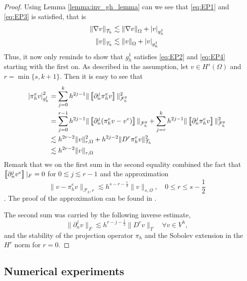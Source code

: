 \begin{proof}
    Using Lemma \ref{lemma:inv_gh_lemma} can we see that \eqref{eq:EP1} and \eqref{eq:EP3} is satisfied, that is \[
    \begin{split}
        \| \nabla v \|_{ \mathcal{T} _{h} }^{  } & \lesssim \| \nabla v \|_{ \Omega  }^{  }  + \left\lvert  v  \right\rvert _{g_{h}^{1}} \\
        \|  v \|_{ \mathcal{T} _{h} }^{  } & \lesssim \|  v \|_{ \Omega  }^{  }  + \left\lvert  v  \right\rvert _{g_{h}^{1}}
    \end{split}
    \]
    Thus, it now only reminds to show that $g_{h}^{1}$  satisfies \eqref{eq:EP2} and \eqref{eq:EP4} starting with the first on. As described in the assumption, let $v \in H^{s}( \Omega ) $ and $r = \min \{s, k+1\} $. Then it is easy to see that \[
        \begin{split}
        \abs{ \pi ^{e}_{h} v }_{g_{h}^{l}}^{2} & = \sum_{j=0}^{k} h^{2j-1} \| \jump{ \partial ^{j}_{n}\pi ^{e}_{h} v  }  \|_{\mathcal{F} _{h}^{g}  }^{2  } \\
        &= \sum_{j=0}^{r-1} h^{2j -1} \| \jump{ \partial ^{j}_{n} ( \pi _{h}^{e} v - v^{e}) }    \|_{\mathcal{F} _{h}^{g}  }^{  } +  \sum_{j=r}^{k} h^{2j-1} \| \jump{ \partial ^{j}_{n} \pi ^{e}_{h} v }   \|_{\mathcal{F} _{h}^{g}  }^{ 2 }    \\
        & \lesssim h^{2r- 2}\| v \|_{ r,\Omega  }^{ 2 } + h^{2j-2}\| D^{r} \pi ^{e}_{h} v \|_{ \mathcal{T} _{h} }^{ 2 }   \\
        & \lesssim h^{2r -2 } \| v \|_{ r,\Omega  }^{  }
        \end{split}
    \]
    Remark that we on the first sum in the second equality combined the fact that $\left[\!\!\left[  \partial _{n}^{j} v^{e}  \right]\!\!\right]| _{F} = 0 $ for $0\lesssim j \lesssim r-1$ and the approximation \[
    \| v-\pi _{h}^{e} v \|_{ \mathcal{F} _{h},r  }^{  } \lesssim h^{s-r -\frac{1}{2}} \| v \|_{ s,\Omega  }^{  }, \quad 0 \le r \le  s-\frac{1}{2}
\]. The proof of the approximation can be found in \cite[Chapter 2.41]{gurkan2019stabilized}.

The second sum was carried by the following inverse estimate, \[
\| \partial ^{j}_{n}v \|_{ F }^{  }  \lesssim h^{r - j - \frac{1}{2}} \| D^{r} v \|_{ T }^{  } \quad  \forall v \in V^{h},
\]
and the stability of the projection operator $\pi _{h}$ and the Sobolev extension in the $H^{r}$ norm for $r=0$.
\end{proof}


\subsection{Numerical experiments}%
\label{sub:numerical_experiments}




